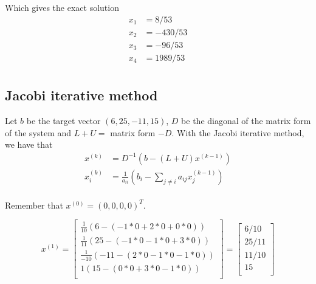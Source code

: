 Which gives the exact solution
\begin{align*}
    x_1 &= 8 / 53 \\
    x_2 &= -430 / 53 \\
    x_3 &= -96 / 53 \\
    x_4 &= 1989 / 53 \\
\end{align*}


\pagebreak

\subsection{Jacobi iterative method}
Let $b$ be the target vector $(6, 25, -11, 15)$, $D$ be the diagonal of the matrix form of the system and $L + U = $ matrix form $- D$. With the Jacobi iterative method, we have that
\begin{align*}
    x^{(k)} &= D^{-1} \left( b - (L + U)x^{(k-1)} \right) \\
    x_i^{(k)} &= \frac{1}{a_{ii}} \left( b_i - \sum_{j \ne i} a_{ij}x_j^{(k-1)} \right) \\
\end{align*}

Remember that $x^{(0)} = (0, 0, 0, 0)^T$.

\begin{equation*}
    x^{(1)} = \begin{bmatrix}
        \frac{1}{10} \left( 6 - (-1*0 + 2*0 + 0*0) \right) \\
        \frac{1}{11} \left( 25 - (-1*0 - 1*0 + 3*0) \right) \\
        \frac{1}{-10} \left( -11 - (2*0 - 1*0 - 1*0) \right) \\
        1 \left( 15 - (0*0 + 3*0 - 1*0) \right) \\
    \end{bmatrix}
    = \begin{bmatrix}
        6 / 10 \\
        25 / 11 \\
        11 / 10 \\
        15 \\
    \end{bmatrix}
\end{equation*}


